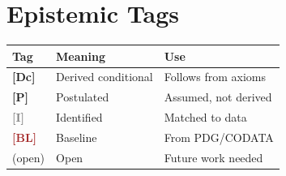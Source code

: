 \documentclass[11pt,a4paper]{book}
\theoremstyle{definition}
\theoremstyle{remark}
\newcommand{\tagBL}{\textcolor{brown}{\textbf{[BL]}}}
\newcommand{\tagDc}{\textcolor{calibratedColor}{\textbf{[Dc]}}}
\newcommand{\tagI}{\textcolor{gray}{\textbf{[I]}}}
\newcommand{\tagP}{\textcolor{postulatedColor}{\textbf{[P]}}}
\begin{document}
\section*{Epistemic Tags}

\begin{center}
\begin{tabular}{lll}
\toprule
\textbf{Tag} & \textbf{Meaning} & \textbf{Use} \\
\midrule
\tagDc{} & Derived conditional & Follows from axioms \\
\tagP{} & Postulated & Assumed, not derived \\
\tagI{} & Identified & Matched to data \\
\tagBL{} & Baseline & From PDG/CODATA \\
(open) & Open & Future work needed \\
\bottomrule
\end{tabular}
\end{center}










\printbibliography[heading=bibintoc,title={References}]
\end{document}

